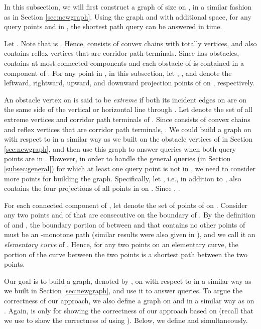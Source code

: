 \documentclass[english,runningheads,11pt]{llncs}
\begin{document}
In this subsection, we will first construct a graph  of
size  on
, in a similar fashion as  in
Section \ref{sec:newgraph}. Using the graph  and with
additional  space, for any query points  and  in , the
shortest path query can be answered in  time.


Let . Note that  is .
Hence,  consists of  convex chains with totally  vertices,
and  also contains  reflex vertices that are
corridor path terminals. Since  has  obstacles,
 contains at most  connected components and each
obstacle of  is contained in a component of .
For any point  in , in this subsection, let ,
, and  denote the leftward, rightward,
upward, and downward projection points of  on , respectively.

An obstacle vertex  on  is said to be {\em extreme} if both its
incident edges on  are on the same side of the vertical or horizontal line through . Let  denote the set of all extreme vertices and corridor
path terminals of . Since  consists of 
convex chains and  reflex vertices that are corridor path
terminals, .  We could build a graph
on  with respect to  in a similar way as we built
 on the obstacle vertices of  in Section \ref{sec:newgraph},
and then use this graph to answer queries when both query points are in
. However, in order to handle the general queries (in
Section \ref{subsec:general}) for which at least one query point is not in
, we need to consider more points for building the graph.
Specifically, let , i.e., in addition to ,
 also contains the four projections of all points in
 on .
Since , .



For each connected component  of
, let  denote the set of points of  on .
Consider any two points  and  of  that are consecutive on the
boundary  of . By the definition of  and
, the boundary portion of  between  and  that
contains no other points of  must be an -monotone
path (similar results were also given in
\cite{ref:ChenA11ESA,ref:ChenCo12arXiv,ref:ChenL113STACS,ref:InkuluPl09}), and we
call it an {\em elementary curve} of . Hence, for any two
points on an elementary curve, the portion of the curve between the
two points is a shortest path between the two points.

Our goal is to build a graph, denoted by , on 
with respect to 
in a similar way as we built  in Section \ref{sec:newgraph}, and use it to
answer queries. To argue the correctness of our approach, we
also define a graph  on  and  in a
similar way as  on . Again,
 is only for showing the correctness of our approach
based on  (recall that we use  to show the
correctness of using ). Below, we define  and
 simultaneously.
\end{document}
